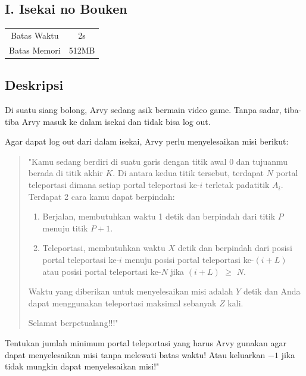 \documentclass{article}
\begin{document}
\begin{center}
    \section*{I. Isekai no Bouken} %

    \begin{tabular}{ | c c | }
        \hline
        Batas Waktu  & 2s \\    %
        Batas Memori & 512MB \\  %
        \hline
    \end{tabular}
\end{center}

\subsection*{Deskripsi}
Di suatu siang bolong, Arvy sedang asik bermain video game. Tanpa sadar, tiba-tiba Arvy masuk ke dalam isekai dan tidak bisa log out.

Agar dapat log out dari dalam isekai, Arvy perlu menyelesaikan misi berikut: 

\begin{quote}
"Kamu sedang berdiri di suatu garis dengan titik awal 0 dan tujuanmu berada di titik akhir $K$. Di antara kedua titik tersebut, terdapat $N$ portal teleportasi dimana setiap portal teleportasi ke-$i$ terletak padatitik $A_i$. Terdapat 2 cara kamu dapat berpindah:
\begin{enumerate}
    \setlength\itemsep{0pt}
    \item Berjalan, membutuhkan waktu 1 detik dan berpindah dari titik $P$ menuju titik $P+1$.
    \item Teleportasi, membutuhkan waktu $X$ detik dan berpindah dari posisi portal teleportasi ke-$i$ menuju posisi portal teleportasi ke-$(i+L)$ atau posisi portal teleportasi ke-$N$ jika $(i+L)$ $\ge$ $N$.
\end{enumerate}
Waktu yang diberikan untuk menyelesaikan misi adalah $Y$ detik dan Anda dapat menggunakan teleportasi maksimal sebanyak $Z$ kali. 

Selamat berpetualang!!!"
\end{quote}

Tentukan jumlah minimum portal teleportasi yang harus Arvy gunakan agar dapat menyelesaikan misi tanpa melewati batas waktu! Atau keluarkan $-1$ jika tidak mungkin dapat menyelesaikan misi!"
\end{document}

